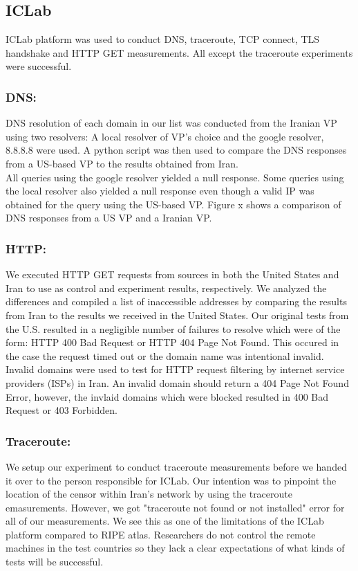 \subsection{ICLab}
ICLab platform was used to conduct DNS, traceroute, TCP connect, TLS handshake and HTTP GET measurements. All except the traceroute experiments were successful. 
\subsubsection{DNS:} DNS resolution of each domain in our list was conducted from the Iranian VP using two resolvers: A local resolver of VP's choice and the google resolver, 8.8.8.8 were used. A python script was then used to compare the DNS responses from a US-based VP to the results obtained from Iran. \\
All queries using the google resolver yielded a null response. Some queries using the local resolver also yielded a null response even though a valid IP was obtained for the query using the US-based VP.  Figure x shows a comparison of DNS responses from a US VP and a Iranian VP.\\
\subsubsection{HTTP:}
We executed HTTP GET requests from sources in both the United States and Iran to use as control and experiment results, respectively. We analyzed the differences and compiled a list of inaccessible addresses by comparing the results from Iran to the results we received in the United States. Our original tests from the U.S.  resulted in a negligible number of failures to resolve which were of the form: HTTP 400 Bad Request or HTTP 404 Page Not Found. This occured in the case the request timed out or the domain name was intentional invalid. Invalid domains were used to test for HTTP request filtering by internet service providers (ISPs) in Iran. An invalid domain should return a 404 Page Not Found Error, however, the invlaid domains which were blocked resulted in 400 Bad Request or 403 Forbidden.\\ 

\subsubsection{Traceroute:} We setup our experiment to conduct traceroute measurements before we handed it over to the person responsible for ICLab. Our intention was to pinpoint the location of the censor within Iran’s network by using the traceroute emasurements. However, we got "traceroute not found or not installed" error for all of our measurements. We see this as one of the limitations of the ICLab platform compared to RIPE atlas. Researchers do not control the remote machines in the test countries so they lack a clear expectations of what kinds of tests will be successful. \\

